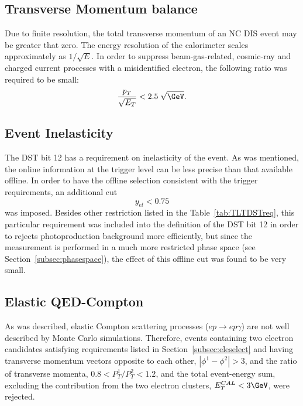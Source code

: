 \subsection{Transverse Momentum balance}
\label{subsec:empzcut}
Due to finite resolution, the total transverse momentum of an NC DIS event may be greater that zero. The energy resolution of the calorimeter scales approximately as $1/\sqrt{E}$. In order to suppress beam-gas-related, cosmic-ray and charged current processes with a misidentified electron, the following ratio was required to be small:
\begin{equation}
\frac{p_T}{\sqrt{E_T}} < 2.5\;\sqrt{\GeV}.
\label{eq:ptcut}
\end{equation}

\subsection{Event Inelasticity}
\label{subsec:yelcut}

The DST bit 12 has a requirement on inelasticity of the event. As was mentioned, the online information at the trigger level can be less precise than that available offline. In order to have the offline selection consistent with the trigger requirements, an additional cut 
\begin{equation}
y_{el} < 0.75
\label{eq:yelcut}
\end{equation}
was imposed. Besides other restriction listed in the Table~\ref{tab:TLTDSTreq}, this particular requirement was included into the definition of the DST bit 12 in order to rejects photoproduction background more efficiently, but since the measurement is performed in a much more restricted phase space (see Section~\ref{subsec:phasespace}), the effect of this offline cut was found to be very small.

\subsection{Elastic QED-Compton}
\label{subsec:elasticqedcut}
As was described, elastic Compton scattering processes ($ep \rightarrow ep\gamma$) are not well described by Monte Carlo simulations. Therefore, events containing two electron candidates satisfying requirements listed in Section~\ref{subsec:eleselect} and having transverse momentum vectors opposite to each other, $\left|\phi^1 - \phi^2\right| > 3$, and the ratio of transverse momenta, $0.8 < P_{T}^1/P_T^{2} < 1.2$, and the total event-energy sum, excluding the contribution from the two electron clusters, $E_T^{CAL} < 3 \GeV$, were rejected.

